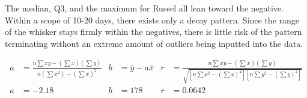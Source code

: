 \documentclass{article}
\begin{document}
\begin{figure}[h]
    \centering
\end{figure}
The median, Q3, and the maximum for Russel all lean toward the negative. Within a scope of 10-20 days, there exists only a decay pattern. Since the range of the whisker stays firmly within the negatives, there is little risk of the pattern terminating without an extreme amount of outliers being inputted into the data. 



\begin{align*}
    a&=\frac{n \sum x y-\left(\sum x\right)\left(\sum y\right)}{n\left(\sum x^2\right)-\left(\sum x\right)^2} & b&=\bar{y}-a \bar{x} & r&=\frac{n \sum x y-\left(\sum x\right)\left(\sum y\right)}{\sqrt{\left[n \sum x^2-\left(\sum x\right)^2\right]\left[n \sum y^2-\left(\sum y\right)^2\right]}}\\
    a&=-2.18     & b&=178         & r&=0.0642
\end{align*}
\end{document}
